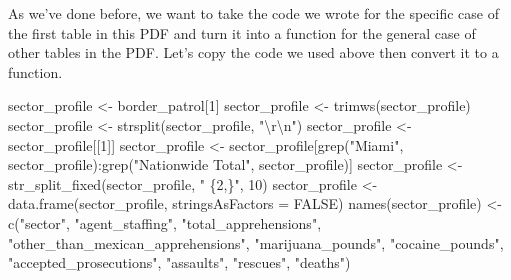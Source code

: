 \documentclass[
  12pt,
]{book}
\newenvironment{Shaded}{\begin{snugshade}}{\end{snugshade}}
\newcommand{\AttributeTok}[1]{\textcolor[rgb]{0.61,0.61,0.61}{#1}}
\newcommand{\ConstantTok}[1]{\textcolor[rgb]{0,0,0}{#1}}
\newcommand{\DecValTok}[1]{\textcolor[rgb]{0.06,0.06,0.06}{#1}}
\newcommand{\FunctionTok}[1]{\textcolor[rgb]{0,0,0}{#1}}
\newcommand{\NormalTok}[1]{#1}
\newcommand{\OtherTok}[1]{\textcolor[rgb]{0.37,0.37,0.37}{#1}}
\newcommand{\SpecialCharTok}[1]{\textcolor[rgb]{0,0,0}{#1}}
\newcommand{\StringTok}[1]{\textcolor[rgb]{0.5,0.5,0.5}{#1}}
\begin{document}
As we've done before, we want to take the code we wrote for the specific case of the first table in this PDF and turn it into a function for the general case of other tables in the PDF. Let's copy the code we used above then convert it to a function.

\begin{Shaded}
\begin{Highlighting}[]
\NormalTok{sector\_profile }\OtherTok{\textless{}{-}}\NormalTok{ border\_patrol[}\DecValTok{1}\NormalTok{]}
\NormalTok{sector\_profile }\OtherTok{\textless{}{-}} \FunctionTok{trimws}\NormalTok{(sector\_profile)}
\NormalTok{sector\_profile }\OtherTok{\textless{}{-}} \FunctionTok{strsplit}\NormalTok{(sector\_profile, }\StringTok{"}\SpecialCharTok{\textbackslash{}r\textbackslash{}n}\StringTok{"}\NormalTok{)}
\NormalTok{sector\_profile }\OtherTok{\textless{}{-}}\NormalTok{ sector\_profile[[}\DecValTok{1}\NormalTok{]]}
\NormalTok{sector\_profile }\OtherTok{\textless{}{-}}\NormalTok{ sector\_profile[}\FunctionTok{grep}\NormalTok{(}\StringTok{"Miami"}\NormalTok{, sector\_profile)}\SpecialCharTok{:}\FunctionTok{grep}\NormalTok{(}\StringTok{"Nationwide Total"}\NormalTok{, sector\_profile)]}
\NormalTok{sector\_profile }\OtherTok{\textless{}{-}} \FunctionTok{str\_split\_fixed}\NormalTok{(sector\_profile, }\StringTok{" \{2,\}"}\NormalTok{, }\DecValTok{10}\NormalTok{)}
\NormalTok{sector\_profile }\OtherTok{\textless{}{-}} \FunctionTok{data.frame}\NormalTok{(sector\_profile, }\AttributeTok{stringsAsFactors =} \ConstantTok{FALSE}\NormalTok{)}
\FunctionTok{names}\NormalTok{(sector\_profile) }\OtherTok{\textless{}{-}} \FunctionTok{c}\NormalTok{(}\StringTok{"sector"}\NormalTok{,}
                           \StringTok{"agent\_staffing"}\NormalTok{,}
                           \StringTok{"total\_apprehensions"}\NormalTok{,}
                           \StringTok{"other\_than\_mexican\_apprehensions"}\NormalTok{, }
                           \StringTok{"marijuana\_pounds"}\NormalTok{,}
                           \StringTok{"cocaine\_pounds"}\NormalTok{,}
                           \StringTok{"accepted\_prosecutions"}\NormalTok{,}
                           \StringTok{"assaults"}\NormalTok{,}
                           \StringTok{"rescues"}\NormalTok{,}
                           \StringTok{"deaths"}\NormalTok{)}
\end{Highlighting}
\end{Shaded}
\end{document}
